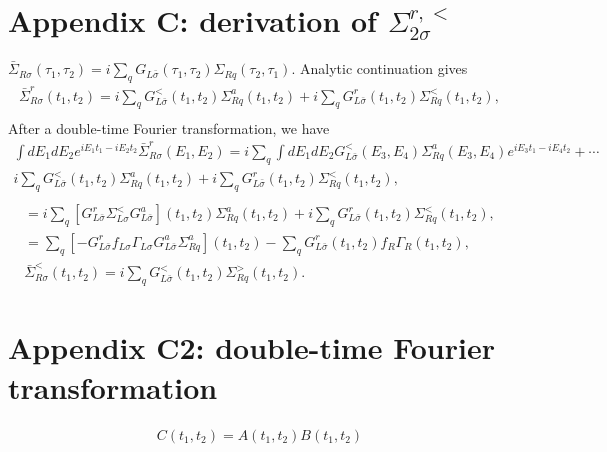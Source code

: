 \documentclass[aps,prb,superscriptaddress]{revtex4-2}
\begin{document}
\section*{Appendix C: derivation of $\Sigma_{2\sigma}^{r,<}$}
${\bar \Sigma}_{R\sigma}(\tau_1,\tau_2) =i\sum_q G_{L\bar\sigma}(\tau_1,\tau_2)\Sigma_{Rq}(\tau_2,\tau_1)$. Analytic continuation gives
\begin{gather}
{\bar \Sigma}_{R\sigma}^r(t_1,t_2) =i\sum_q G_{L\bar\sigma}^<(t_1, t_2)\Sigma_{Rq}^a(t_1, t_2) + i\sum_qG_{L\bar\sigma}^r(t_1, t_2)\Sigma_{Rq}^<(t_1, t_2),\\
\end{gather}
After a double-time Fourier transformation, we have
\begin{gather}
\int dE_1 dE_2 e^{iE_1t_1-iE_2t_2}{\bar \Sigma}_{R\sigma}^r(E_1,E_2) = i\sum_q\int dE_1 dE_2 G_{L\bar\sigma}^<(E_3, E_4)\Sigma_{Rq}^a(E_3,E_4)e^{iE_3t_1-iE_4t_2}+\cdots\\
i\sum_q G_{L\bar\sigma}^<(t_1, t_2)\Sigma_{Rq}^a(t_1, t_2) + i\sum_qG_{L\bar\sigma}^r(t_1, t_2)\Sigma_{Rq}^<(t_1, t_2),\\
\end{gather}
\begin{gather}
= i\sum_q [G_{L\bar\sigma}^r\Sigma_{L\sigma}^{<}G_{L\bar\sigma}^a](t_1, t_2)\Sigma_{Rq}^a(t_1, t_2) +i\sum_q G_{L\bar\sigma}^r(t_1, t_2)\Sigma_{Rq}^<(t_1, t_2), \\
= \sum_q [-G_{L\bar\sigma}^rf_{L\sigma}\Gamma_{L\sigma}G_{L\bar\sigma}^a\Sigma_{Rq}^a](t_1, t_2) - \sum_q G_{L\bar\sigma}^r(t_1, t_2)f_{R}\Gamma_R(t_1, t_2), \\
{\bar \Sigma}_{R\sigma}^<(t_1,t_2) =i\sum_q G_{L\bar\sigma}^<(t_1, t_2)\Sigma_{Rq}^>(t_1, t_2).
\end{gather}

\section*{Appendix C2: double-time Fourier transformation}
\begin{gather}
C(t_1, t_2) = A(t_1, t_2)B(t_1, t_2)
\end{gather}
\end{document}
